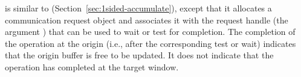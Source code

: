 
 is similar to 
(Section~\ref{sec:1sided-accumulate}),
except that it allocates a communication request object and associates
it with the request handle (the argument ) that can be
used to wait or test for completion. The completion of the
operation at the origin (i.e., after the corresponding test or wait) indicates that the origin buffer
is free to be updated. It does not indicate that the operation has
completed at the target window.

